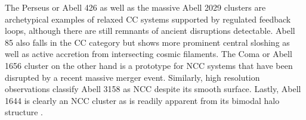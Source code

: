 The Perseus or Abell 426 as well as the massive Abell 2029 clusters are archetypical examples of relaxed CC systems supported
by regulated feedback loops, although there are still remnants of ancient disruptions detectable. Abell 85 also falls in the
CC category but shows more prominent central sloshing as well as active accretion from intersecting cosmic filaments. The Coma
or Abell 1656 cluster on the other hand is a prototype for NCC systems that have been disrupted by a recent massive merger
event. Similarly, high resolution observations classify Abell 3158 as NCC despite its smooth \xray surface. Lastly, Abell 1644
is clearly an NCC cluster as is readily apparent from its bimodal halo structure \cite{boeh2010, ecke2017}.
